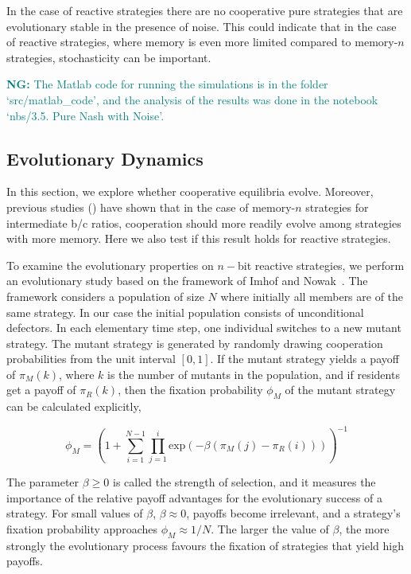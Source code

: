 \documentclass{article}
\theoremstyle{definition}
\newcommand{\nikoleta}[1]{\textcolor{teal}{{\bf NG:} #1}}
\begin{document}
In the case of reactive strategies there are no cooperative pure
strategies that are evolutionary stable in the presence of noise. This could
indicate that in the case of reactive strategies, where memory is even more
limited compared to memory-\(n\) strategies, stochasticity can be important.

\nikoleta{The Matlab code for running the simulations is in the folder
`src/matlab\_code', and the analysis of the results was done in the
notebook `nbs/3.5. Pure Nash with Noise'.}

\subsection{Evolutionary Dynamics}\label{section:evolutionary_simulations}

In this section, we explore whether cooperative equilibria evolve. Moreover,
previous studies (\citep{hilbe:PNAS:2017}) have shown that in the case of
memory-\(n\) strategies for intermediate b/c ratios, cooperation should more
readily evolve among strategies with more memory. Here we also test if this
result holds for reactive strategies.

To examine the evolutionary properties on \(n-\)bit reactive strategies, we
perform an evolutionary study based on the framework of Imhof and
Nowak~\citep{imhof:royal:2010}. The framework considers a population of size
\(N\) where initially all members are of the same strategy. In our case the
initial population consists of unconditional defectors. In each elementary time
step, one individual switches to a new mutant strategy. The mutant strategy is
generated by randomly drawing cooperation probabilities from the unit interval
\([0,1]\). If the mutant strategy yields a payoff of \(\pi_{M}(k)\), where \(k\)
is the number of mutants in the population, and if residents get a payoff of
\(\pi_{R}(k)\), then the fixation probability \(\phi_{M}\) of the mutant
strategy can be calculated explicitly,

\begin{equation}\label{eq:fixation_probability}
  \phi_{M} = \left(1 + \sum_{i=1}^{N - 1} \prod_{j=1}^{i} \text{exp} (- \beta (\pi_{M}(j) - \pi_{R}(i))) \right)^{-1}
\end{equation}

The parameter \(\beta \geq 0\) is called the strength of selection, and it
measures the importance of the relative payoff advantages for the
evolutionary success of a strategy. For small values of \(\beta\), \(\beta
\approx 0\), payoffs become irrelevant, and a strategy's fixation probability
approaches \(\phi_{M} \approx 1 / N\). The larger the value of \(\beta\), the
more strongly the evolutionary process favours the fixation of strategies that
yield high payoffs.
\end{document}
